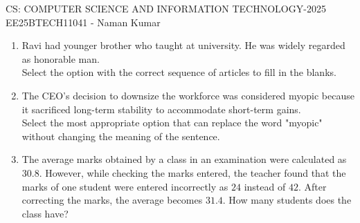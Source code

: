 \documentclass[a4paper, 11pt]{article}
\begin{document}
\begin{center}
    \huge{CS: COMPUTER SCIENCE AND INFORMATION TECHNOLOGY-2025}\\
    \large{EE25BTECH11041 - Naman Kumar}
\end{center}


\begin{enumerate}
    \item Ravi had \underline{\hspace{2cm}} younger brother who taught at \underline{\hspace{2cm}} university. He was widely regarded as \underline{\hspace{2cm}} honorable man.\\Select the option with the correct sequence of articles to fill in the blanks.
    \begin{enumerate}
    \end{enumerate}
    \hfill{}
    \item The CEO's decision to downsize the workforce was considered myopic because it sacrificed long-term stability to accommodate short-term gains.\\Select the most appropriate option that can replace the word "myopic" without changing the meaning of the sentence.
    \begin{enumerate}
    \end{enumerate}
    \hfill{}
    \item The average marks obtained by a class in an examination were calculated as $30.8$. However, while checking the marks entered, the teacher found that the marks of one student were entered incorrectly as $24$ instead of $42$. After correcting the marks, the average becomes $31.4$. How many students does the class have?

\end{enumerate}
\end{document}

